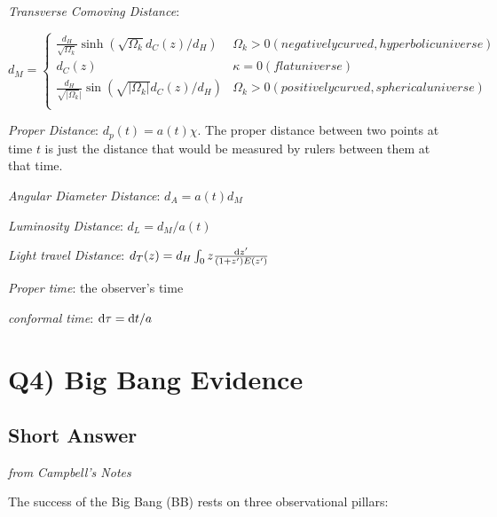 \documentclass[\main/main.tex]{subfiles}
\begin{document}
	{\it Transverse Comoving Distance}:

	$  d_M = \left\{
	\begin{array}{ll}
	      \frac{d_H}{\sqrt{\Omega_k}} \sinh\left(\sqrt{\Omega_k} d_C(z) / d_H\right) & \Omega_k > 0 (negatively curved, hyperbolic universe) \\
	      d_C(z) & \kappa=0 (flat universe) \\
	      \frac{d_H}{\sqrt{|\Omega_k}|} \sin\left(\sqrt{|\Omega_k|} d_C(z) / d_H\right) & \Omega_k > 0 (positively curved, spherical universe) \\
	\end{array} 
	\right. $


	{\it Proper Distance}: $d_p(t) = a(t) \chi$. The proper distance between two points at time $t$ is just the distance that would be measured by rulers between them at that time.


	{\it Angular Diameter Distance}: $d_A = a(t) d_M$

	{\it Luminosity Distance}: $d_L = d_M / a(t)$

	{\it Light travel Distance}: $d_T(z) = d_H \int_{0}{z} \frac{\dif{z'}}{(1+z')E(z')}$


	{\it Proper time}: the observer's time

	{\it conformal time}: $\dif{\tau} = \dif{t} / a$


	




\newpage
\section{Q4) Big Bang Evidence} %
\label{sec:q4_big_bang_evidence}

	\subsection{Short Answer} %
	\label{sub:short_answer}
	{\it from Campbell's Notes}
	
	The success of the Big Bang (BB) rests on three observational pillars:
\end{document}
